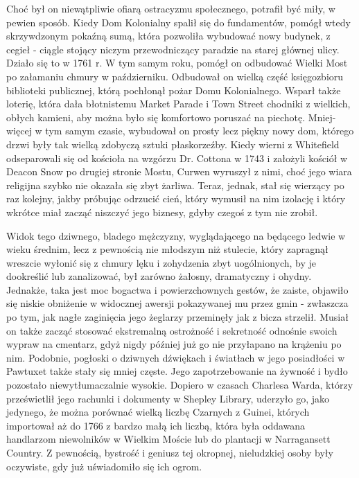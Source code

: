 Choć był on niewątpliwie ofiarą ostracyzmu społecznego, potrafił być miły, w pewien sposób. Kiedy Dom Kolonialny spalił się do fundamentów, pomógł wtedy skrzywdzonym pokaźną sumą, która pozwoliła wybudować nowy budynek, z cegieł - ciągle stojący niczym przewodniczący paradzie na starej głównej ulicy. Działo się to w 1761 r. W tym samym roku, pomógł on odbudować Wielki Most po załamaniu chmury w październiku. Odbudował on wielką część księgozbioru biblioteki publicznej, którą pochłonął pożar Domu Kolonialnego. Wsparł także loterię, która dała błotnistemu Market Parade i Town Street chodniki z wielkich, obłych kamieni, aby można było się komfortowo poruszać na piechotę. Mniej-więcej w tym samym czasie, wybudował on prosty lecz piękny nowy dom, którego drzwi były tak wielką zdobyczą sztuki płaskorzeźby. Kiedy wierni z Whitefield odseparowali się od kościoła na wzgórzu Dr. Cottona w 1743 i założyli kościół w Deacon Snow po drugiej stronie Mostu, Curwen wyruszył z nimi, choć jego wiara religijna szybko nie okazała się zbyt żarliwa. Teraz, jednak, stał się wierzący po raz kolejny, jakby próbując odrzucić cień, który wymusił na nim izolację i który wkrótce miał zacząć niszczyć jego biznesy, gdyby czegoś z tym nie zrobił. 

Widok tego dziwnego, bladego mężczyzny, wyglądającego na będącego ledwie w wieku średnim, lecz z pewnością nie młodszym niż stulecie, który zapragnął wreszcie wyłonić się z chmury lęku i zohydzenia zbyt uogólnionych, by je dookreślić lub zanalizować, był zarówno żałosny, dramatyczny i ohydny. Jednakże, taka jest moc bogactwa i powierzchownych gestów, że zaiste, objawiło się niskie obniżenie w widocznej awersji pokazywanej mu przez gmin - zwłaszcza po tym, jak nagłe zaginięcia jego żeglarzy przeminęły jak z bicza strzelił. Musiał on także zacząć stosować ekstremalną ostrożność i sekretność odnośnie swoich wypraw na cmentarz, gdyż nigdy później już go nie przyłapano na krążeniu po nim. Podobnie, pogłoski o dziwnych dźwiękach i światłach w jego posiadłości w Pawtuxet także stały się mniej częste. Jego zapotrzebowanie na żywność i bydło pozostało niewytłumaczalnie wysokie. Dopiero w czasach Charlesa Warda, którzy prześwietlił jego rachunki i dokumenty w Shepley Library, uderzyło go, jako jedynego, że można porównać wielką liczbę Czarnych z Guinei, których importował aż do 1766 z bardzo małą ich liczbą, która była oddawana handlarzom niewolników w Wielkim Moście lub do plantacji w Narragansett Country. Z pewnością, bystrość i geniusz tej okropnej, nieludzkiej osoby były oczywiste, gdy już uświadomiło się ich ogrom.

